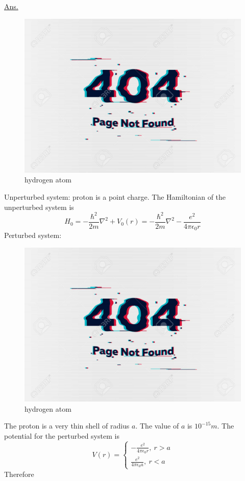\begin{enumerate}[label=Problem.\arabic*,start=1]
			\underline{Ans.}\\
			\begin{figure}
				\centering
				\includegraphics[width=0.5\linewidth]{Pictures/not-found.jpg}
				\caption{hydrogen atom}
			\end{figure}
			Unperturbed system: proton is a point charge. The Hamiltonian  of the unperturbed system is
			\begin{equation}
				H_0 = - \frac{\hbar^2}{2 m} \nabla^2 + V_0(r) = - \frac{\hbar^2}{2 m} \nabla^2 - \frac{e^2}{4 \pi \epsilon_0 r}
			\end{equation}
			Perturbed system:\\
			
			\begin{figure}
				\centering
				\includegraphics[width=0.5\linewidth]{Pictures/not-found.jpg}
				\caption{hydrogen atom}
			\end{figure}
		The proton is a very thin shell of radius $a$. The value of $a$ is $10^{-15}m$. The potential for the perturbed system is
		\begin{equation}
			V(r) = \begin{cases}
			-\frac{e^2}{4 \pi \epsilon_0 r},\ r > a \\
			\frac{e^2}{4 \pi \epsilon_0 a}, \ r < a
			\end{cases}
		\end{equation}
			Therefore
			

\end{enumerate}
